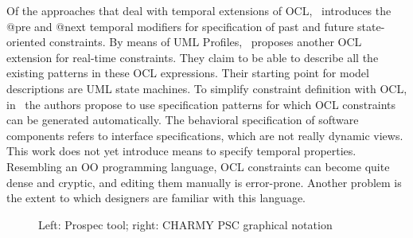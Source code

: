 \documentclass[letter]{llncs}
\begin{document}
Of the approaches that deal with temporal extensions of OCL,~\cite{Ziemann02anextension}
introduces the @pre and @next temporal modifiers for specification of past and future state-oriented constraints. 
By means of UML Profiles,~\cite{Flake03formalsemantics}
proposes another OCL extension for real-time constraints. They claim to be able to describe all the existing 
patterns in these OCL expressions. Their starting point for model descriptions are UML state machines.
To simplify constraint definition with OCL, in~\cite{Ackermann:2006:LOS:2135315.2135339} the authors 
propose to use specification patterns for which OCL constraints can be generated automatically.
The behavioral specification of software components refers to interface specifications,
which are not really dynamic views. This work does not yet introduce means to specify temporal properties.
Resembling an OO programming language, OCL constraints can become quite dense and cryptic, and editing 
them manually is error-prone. Another problem is the extent to which designers are familiar with this language.
\begin{figure}[t!]
  \centering
  \hfill
  \caption{Left: Prospec tool; right: CHARMY PSC graphical notation}
  \label{fig:Approaches}
\end{figure}
\end{document}
